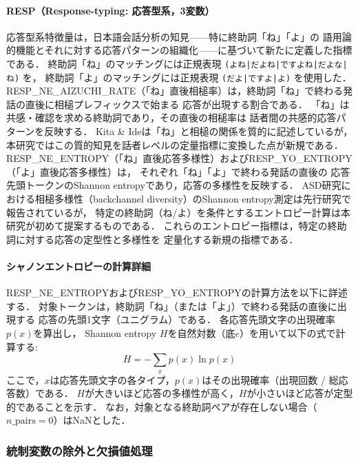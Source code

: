 \documentclass[dvipdfmx,11pt,a4paper]{bxjsarticle}
\begin{document}
\paragraph{RESP（Response-typing: 応答型系，3変数）}
応答型系特徴量は，日本語会話分析の知見——特に終助詞「ね」「よ」の
語用論的機能とそれに対する応答パターンの組織化——に基づいて新たに定義した指標である．
終助詞「ね」のマッチングには正規表現 \texttt{(よね|だよね|ですよね|だよな|ね)} を，
終助詞「よ」のマッチングには正規表現 \texttt{(だよ|ですよ|よ)} を使用した．
RESP\_NE\_AIZUCHI\_RATE（「ね」直後相槌率）は，終助詞「ね」で終わる発話の直後に相槌プレフィックスで始まる
応答が出現する割合である．
「ね」は共感・確認を求める終助詞であり，その直後の相槌率は
話者間の共感的応答パターンを反映する．
Kita \& Ide\cite{kita2007}は「ね」と相槌の関係を質的に記述しているが，
本研究ではこの質的知見を話者レベルの定量指標に変換した点が新規である．
RESP\_NE\_ENTROPY（「ね」直後応答多様性）およびRESP\_YO\_ENTROPY（「よ」直後応答多様性）は，
それぞれ「ね」「よ」で終わる発話の直後の
応答先頭トークンのShannon entropyであり，応答の多様性を反映する．
ASD研究における相槌多様性（backchannel diversity）のShannon entropy測定は先行研究で報告されているが\cite{dindar2022}，
特定の終助詞（ね/よ）を条件とするエントロピー計算は本研究が初めて提案するものである．
これらのエントロピー指標は，特定の終助詞に対する応答の定型性と多様性を
定量化する新規の指標である．

\paragraph{シャノンエントロピーの計算詳細}
RESP\_NE\_ENTROPYおよびRESP\_YO\_ENTROPYの計算方法を以下に詳述する．
対象トークンは，終助詞「ね」（または「よ」）で終わる発話の直後に出現する
応答の先頭1文字（ユニグラム）である．
各応答先頭文字の出現確率$p(x)$を算出し，
Shannon entropy $H$を自然対数（底$e$）を用いて以下の式で計算する:
\begin{equation}
H = -\sum_{x} p(x) \ln p(x)
\end{equation}
ここで，$x$は応答先頭文字の各タイプ，$p(x)$はその出現確率（出現回数 / 総応答数）である．
$H$が大きいほど応答の多様性が高く，$H$が小さいほど応答が定型的であることを示す．
なお，対象となる終助詞ペアが存在しない場合（$n\_\text{pairs} = 0$）はNaNとした．

\subsubsection{統制変数の除外と欠損値処理}
\end{document}
